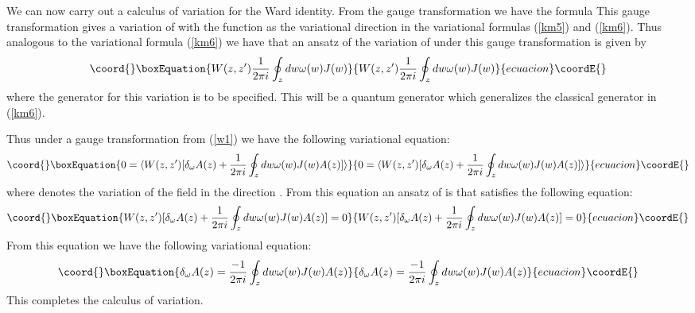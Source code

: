 \documentclass[a4paper,a4paper]{article}
\begin{document}
We can now carry out a calculus of variation for the Ward identity.
From the gauge transformation we have the formula 
\coordHE{}
This gauge transformation gives a variation of 
\coordHE{} with
the function \myHighlight{$\omega$}\coordHE{}
as the variational direction \myHighlight{$\omega$}\coordHE{} in the
variational formulas (\ref{km5}) and  (\ref{km6}).
Thus analogous to the variational formula (\ref{km6})
we have that an ansatz of the variation of \coordHE{} under 
this gauge transformation is given by
\begin{equation}\coord{}\boxEquation{
W(z,z')
  \frac{1}{2\pi i}\oint_z dw \omega(w)J(w)  
\label{int3}
}{
W(z,z')
  \frac{1}{2\pi i}\oint_z dw \omega(w)J(w)  
}{ecuacion}\coordE{}\end{equation}
where the generator \coordHE{} for this variation is to
be specified. This \coordHE{} will be a quantum generator
which generalizes the classical generator \coordHE{} in
(\ref{km6}).

Thus under a gauge transformation  
from (\ref{w1})
we have the following variational equation:
\begin{equation}\coord{}\boxEquation{
0= \langle W(z,z')[\delta_{\omega}A(z)+\frac{1}{2\pi i}\oint_z dw\omega(w)J(w)A(z)]\rangle
\label{w2}
}{
0= \langle W(z,z')[\delta_{\omega}A(z)+\frac{1}{2\pi i}\oint_z dw\omega(w)J(w)A(z)]\rangle
}{ecuacion}\coordE{}\end{equation}
where \coordHE{} denotes the variation of the field \coordHE{} in the direction \myHighlight{$\omega$}\coordHE{}.
From this equation an ansatz of \coordHE{} is that \coordHE{}
satisfies the following equation:
\begin{equation}\coord{}\boxEquation{
W(z,z')[\delta_{\omega}A(z)+\frac{1}{2\pi i}\oint_z dw\omega(w)J(w)A(z)] =0
\label{n8bb}
}{
W(z,z')[\delta_{\omega}A(z)+\frac{1}{2\pi i}\oint_z dw\omega(w)J(w)A(z)] =0
}{ecuacion}\coordE{}\end{equation}
From this equation we have the following variational equation:
\begin{equation}\coord{}\boxEquation{
\delta_{\omega}A(z)=\frac{-1}{2\pi i}\oint_z dw\omega(w)J(w)A(z)
\label{n8b}
}{
\delta_{\omega}A(z)=\frac{-1}{2\pi i}\oint_z dw\omega(w)J(w)A(z)
}{ecuacion}\coordE{}\end{equation}
This completes the calculus of variation.
\end{document}
